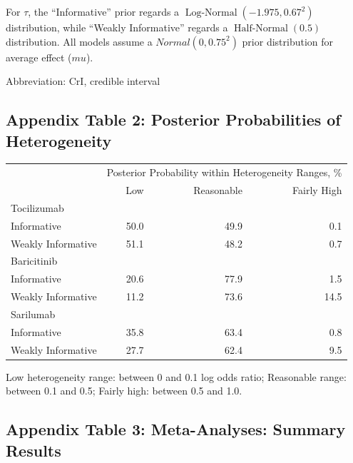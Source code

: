 \documentclass[
  12pt,
]{article}
\begin{document}
For \(\tau\), the ``Informative'' prior regards a
\(\operatorname{Log-Normal}(-1.975, 0.67^2)\) distribution, while
``Weakly Informative'' regards a \(\operatorname{Half-Normal}(0.5)\)
distribution. All models assume a \(Normal(0, 0.75^2)\) prior
distribution for average effect (\(mu\)).

Abbreviation: CrI, credible interval

\newpage

\hypertarget{appendix-table-2-posterior-probabilities-of-heterogeneity}{%
\subsection{Appendix Table 2: Posterior Probabilities of
Heterogeneity}\label{appendix-table-2-posterior-probabilities-of-heterogeneity}}

\captionsetup[table]{labelformat=empty,skip=1pt}
\begin{longtable}{lrrr}
\toprule
 & \multicolumn{3}{c}{Posterior Probability within Heterogeneity Ranges, \%} \\ 
 \cmidrule(lr){2-4}
 & Low & Reasonable & Fairly High \\ 
\midrule
\multicolumn{1}{l}{Tocilizumab} \\ 
\midrule
Informative & 50.0 & 49.9 & 0.1 \\ 
Weakly Informative & 51.1 & 48.2 & 0.7 \\ 
\midrule
\multicolumn{1}{l}{Baricitinib} \\ 
\midrule
Informative & 20.6 & 77.9 & 1.5 \\ 
Weakly Informative & 11.2 & 73.6 & 14.5 \\ 
\midrule
\multicolumn{1}{l}{Sarilumab} \\ 
\midrule
Informative & 35.8 & 63.4 & 0.8 \\ 
Weakly Informative & 27.7 & 62.4 & 9.5 \\ 
 \bottomrule
\end{longtable}
\begin{minipage}{\linewidth}
Low heterogeneity range: between 0 and 0.1 log odds ratio; Reasonable range: between 0.1 and 0.5; Fairly high: between 0.5 and 1.0.\\ 
\end{minipage}

\newpage

\hypertarget{appendix-table-3-meta-analyses-summary-results}{%
\subsection{Appendix Table 3: Meta-Analyses: Summary
Results}\label{appendix-table-3-meta-analyses-summary-results}}
\end{document}
